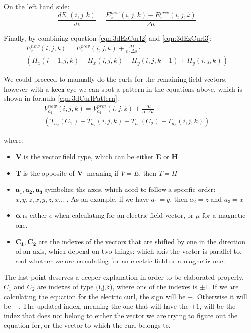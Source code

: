 On the left hand side:
\begin{equation}
	\label{eqn:3dEzCurl3}
	\frac{d E_z(i,j,k)}{dt} = \frac{E_z^{new}(i,j,k) - E_z^{prev}(i,j,k)}{\Delta t}
\end{equation}

Finally, by combining equation \ref{eqn:3dEzCurl2} and \ref{eqn:3dEzCurl3}:
\begin{multline}
	\label{eqn:3dEzCurlFinal}
	E_z^{new}(i,j,k) =  E_z^{prev}(i,j,k) + \frac{\Delta t}{\epsilon \cdot \Delta s} \cdot \\ (H_x(i-1,j,k) - H_x(i,j,k) - H_y(i,j,k-1) + H_y(i,j,k))
\end{multline}

We could proceed to manually do the curls for the remaining field vectors, however with a keen eye we can spot a pattern in the equations above, which is shown in formula \ref{eqn:3dCurlPattern}.
\begin{multline}
	\label{eqn:3dCurlPattern}
	V_{a_1}^{new}(i,j,k) =  V_{a_1}^{prev}(i,j,k) + \frac{\Delta t}{\alpha \cdot \Delta s} \cdot \\ (T_{a_2}(C_1) - T_{a_2}(i,j,k) - T_{a_3}(C_2) + T_{a_3}(i,j,k))
\end{multline}

where:

\begin{itemize}
	\item \textbf{V} is the vector field type, which can be either \textbf{E} or \textbf{H}
	\item \textbf{T} is the opposite of \textbf{V}, meaning if $V = E$, then $T = H$
	\item $\boldsymbol{a_1,a_2,a_3}$ symbolize the axes, which need to follow a specific order: $x,y,z,x,y,z,x...$ . As an example, if we have $a_1 = y$, then $a_2 = z$ and $a_3 = x$
	\item $\boldsymbol{\alpha}$ is either $\epsilon$ when calculating for an electric field vector, or $\mu$ for a magnetic one.
	\item $\boldsymbol{C_1, C_2}$ are the indexes of the vectors that are shifted by one in the direction of an axis, which depend on two things: which axis the vector is parallel to, and whether we are calculating for an electric field or a magnetic one.
\end{itemize}

The last point deserves a deeper explanation in order to be elaborated properly. $C_1$ and $C_2$ are indexes of type (i,j,k), where one of the indexes is $\pm1$. If we are calculating the equation for the electric curl, the sign will be $+$. Otherwise it will be $-$. The updated index, meaning the one that will have the $\pm1$, will be the index that does not belong to either the vector we are trying to figure out the equation for, or the vector to which the curl belongs to.

